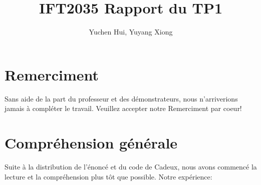 \documentclass{article}
\title{IFT2035 Rapport du TP1}
\author{Yuchen Hui, Yuyang Xiong}
\begin{document}
\maketitle


\section{Remerciment}
Sans aide de la part du professeur et des démonstrateurs, nous n'arriverions jamais à compléter le travail. Veuillez accepter
notre Remerciment par coeur!
\section{Compréhension générale}
Suite à la distribution de l'énoncé et du code de Cadeux, nous avons commencé 
la lecture et la compréhension plus tôt que possible. Notre expérience:



\noindent
\end{document}
